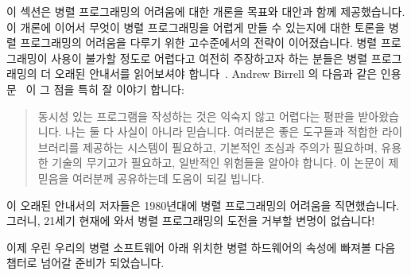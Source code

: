 이 섹션은 병렬 프로그래밍의 어려움에 대한 개론을 목표와 대안과 함께
제공했습니다.
이 개론에 이어서 무엇이 병렬 프로그래밍을 어렵게 만들 수 있는지에 대한 토론을
병렬 프로그래밍의 어려움을 다루기 위한 고수준에서의 전략이 이어졌습니다.
병렬 프로그래밍이 사용이 불가할 정도로 어렵다고 여전히 주장하고자 하는 분들은
병렬 프로그래밍의 더 오래된 안내서를 읽어보셔야
합니다~\cite{SQNTParallel,AndrewDBirrell1989Threads,Beck85,Inman85}.
Andrew Birrell 의 다음과 같은 인용문~\cite{AndrewDBirrell1989Threads} 이 그
점을 특히 잘 이야기 합니다:

\begin{quote}
	동시성 있는 프로그램을 작성하는 것은 익숙지 않고 어렵다는 평판을
	받아왔습니다. 나는 둘 다 사실이 아니라 믿습니다. 여러분은 좋은 도구들과
	적합한 라이브러리를 제공하는 시스템이 필요하고, 기본적인 조심과 주의가
	필요하며, 유용한 기술의 무기고가 필요하고, 일반적인 위험들을 알아야
	합니다. 이 논문이 제 믿음을 여러분께 공유하는데 도움이 되길 빕니다.
\end{quote}

이 오래된 안내서의 저자들은 1980년대에 병렬 프로그래밍의 어려움을 직면했습니다.
그러니, 21세기 현재에 와서 병렬 프로그래밍의 도전을 거부할 변명이 없습니다!

이제 우린 우리의 병렬 소프트웨어 아래 위치한 병렬 하드웨어의 속성에 빠져볼 다음
챕터로 넘어갈 준비가 되었습니다.

